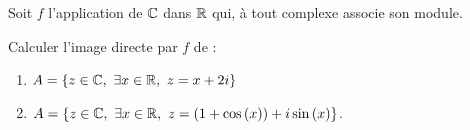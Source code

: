 \documentclass[a4paper, 11pt,reqno]{article}
\begin{document}







\begin{exercice}  \;
	Soit $f$ l'application de $\mathbb{C}$ dans $\mathbb{R}$ qui, \`{a} tout complexe associe son module. %
	\\
	\begin{minipage}[t]{0.55\textwidth}
		\item Calculer l'image directe par $f$ de :
		\begin{enumerate}
			\item $A=\left\lbrace z\in\mathbb{C},\ \exists x\in\mathbb{R},\ z=x+2i\right\rbrace$
			\item $A=\left\lbrace z\in\mathbb{C},\ \exists x\in\mathbb{R},\ z=(1+\cos{(x)})+i\sin{(x)}\right\rbrace$.
		\end{enumerate}
	\end{minipage}
\end{exercice}
\end{document}

